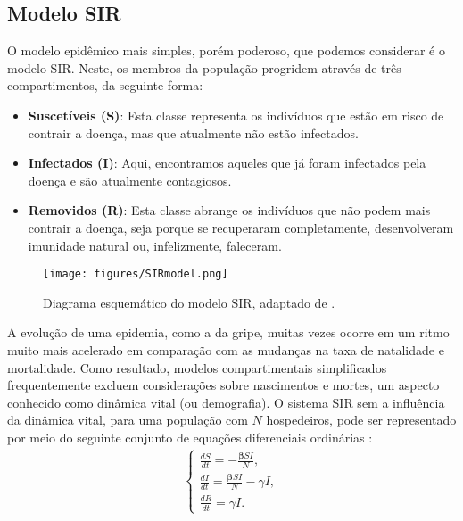 \subsection{Modelo SIR}

O modelo epidêmico mais simples, porém poderoso, que podemos considerar é o modelo SIR. Neste, os membros da população progridem através de três compartimentos, da seguinte forma:
\begin{itemize}
    \item \textcolor{hexagram}{\textbf{Suscetíveis (S)}}: Esta classe representa os indivíduos que estão em risco de contrair a doença, mas que atualmente não estão infectados.
    \item \textcolor{hexagram1}{\textbf{Infectados (I)}}: Aqui, encontramos aqueles que já foram infectados pela doença e são atualmente contagiosos.
    \item \textcolor{hexagram2}{\textbf{Removidos (R)}}: Esta classe abrange os indivíduos que não podem mais contrair a doença, seja porque se recuperaram completamente, desenvolveram imunidade natural ou, infelizmente, faleceram.
\end{itemize}

\begin{figure}[!h]
    \centering
    \texttt{[image: figures/SIRmodel.png]}
    \caption{Diagrama esquemático do modelo SIR, adaptado de .}
    \label{fig:SIR}
\end{figure}

A evolução de uma epidemia, como a da gripe, muitas vezes ocorre em um ritmo muito mais acelerado em comparação com as mudanças na taxa de natalidade e mortalidade. Como resultado, modelos compartimentais simplificados frequentemente excluem considerações sobre nascimentos e mortes, um aspecto conhecido como dinâmica vital (ou demografia). O sistema SIR sem a influência da dinâmica vital, para uma população com $N$ hospedeiros, pode ser representado por meio do seguinte conjunto de equações diferenciais ordinárias \cite{Hethcote2000}:
{\large
\begin{align}
\label{eq:sistema_equacoes}
\begin{cases}
\frac{dS}{dt} = -\frac{{\boldsymbol{\beta}} S I}{N}, \\
\frac{dI}{dt} = \frac{{\boldsymbol{\beta}} S I}{N} - \gamma I, \\
\frac{dR}{dt} = \gamma I.
\end{cases}
\end{align}}

